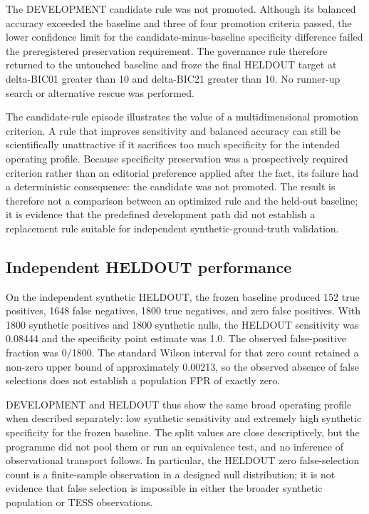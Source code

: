 \documentclass[11pt,a4paper]{article}
\begin{document}
The DEVELOPMENT candidate rule was not promoted. Although its balanced accuracy exceeded the baseline and three of four promotion criteria passed, the lower confidence limit for the candidate-minus-baseline specificity difference failed the preregistered preservation requirement. The governance rule therefore returned to the untouched baseline and froze the final HELDOUT target at delta-BIC01 greater than 10 and delta-BIC21 greater than 10. No runner-up search or alternative rescue was performed.

The candidate-rule episode illustrates the value of a multidimensional promotion criterion. A rule that improves sensitivity and balanced accuracy can still be scientifically unattractive if it sacrifices too much specificity for the intended operating profile. Because specificity preservation was a prospectively required criterion rather than an editorial preference applied after the fact, its failure had a deterministic consequence: the candidate was not promoted. The result is therefore not a comparison between an optimized rule and the held-out baseline; it is evidence that the predefined development path did not establish a replacement rule suitable for independent synthetic-ground-truth validation.

\subsection{Independent HELDOUT performance}
On the independent synthetic HELDOUT, the frozen baseline produced 152 true positives, 1648 false negatives, 1800 true negatives, and zero false positives. With 1800 synthetic positives and 1800 synthetic nulls, the HELDOUT sensitivity was 0.08444 and the specificity point estimate was 1.0. The observed false-positive fraction was 0/1800. The standard Wilson interval for that zero count retained a non-zero upper bound of approximately 0.00213, so the observed absence of false selections does not establish a population FPR of exactly zero.

DEVELOPMENT and HELDOUT thus show the same broad operating profile when described separately: low synthetic sensitivity and extremely high synthetic specificity for the frozen baseline. The split values are close descriptively, but the programme did not pool them or run an equivalence test, and no inference of observational transport follows. In particular, the HELDOUT zero false-selection count is a finite-sample observation in a designed null distribution; it is not evidence that false selection is impossible in either the broader synthetic population or TESS observations.
\end{document}
